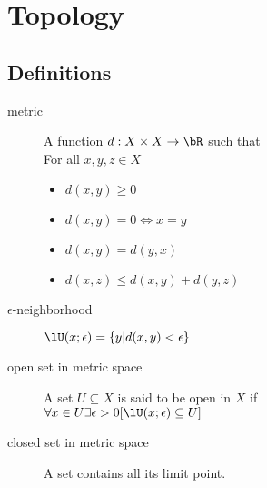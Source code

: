 \section{Topology}

\subsection{Definitions}

\begin{description}
\item[metric]\label{def:metric}
	A function $d: X \times X \to \bR$ such that \hfill\\
	For all $x, y, z \in X$
	\begin{itemize}
	\item $d(x, y)\geq 0$
	\item $d(x, y) = 0 \iff x=y$
	\item $d(x, y) = d(y, x)$
	\item $d(x, z) \leq d(x, y) + d(y, z)$
	\end{itemize}

\item[$\epsilon$-neighborhood]$\lU(x;\epsilon)=\{y|d(x,y)<\epsilon\}$

\item[open set in metric space]\label{def:metric:openset}
	A set $U\subseteq X$ is said to be open in $X$ if\hfill\\
		$\forall x\in U\exists \epsilon>0 [\lU(x;\epsilon)\subseteq U]$\newline

\item[closed set in metric space]\label{def:metric:closedset}
	A set contains all its limit point.\hfill\\
\end{description}